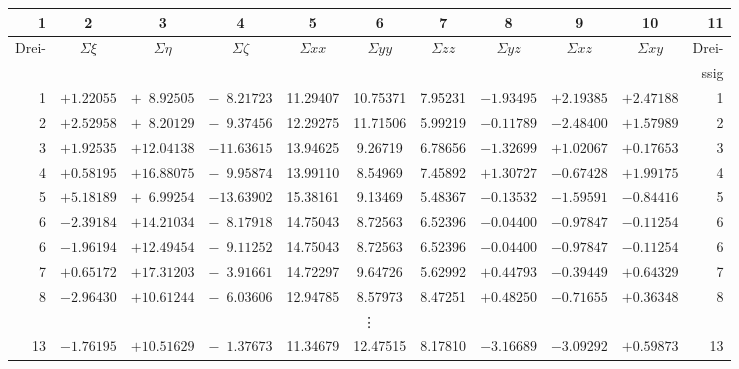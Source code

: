 \documentclass[12pt,a4paper]{article}
\theoremstyle{plain}
\theoremstyle{definition}
\theoremstyle{remark}
\begin{document}
\begin{footnotesize}
\begin{center}
\begin{tabular}{|r|c|c|c||c|c|c|c|c|c||r|}
\hline
1 & 2 & 3 & 4 & 5 & 6 & 7 & 8 & 9 & 10 & 11 \\
\hline
Drei- & $\Sigma\xi$ & $\Sigma\eta$ & $\Sigma\zeta$ &
$\Sigma xx$ & $\Sigma yy$ & $\Sigma zz$ & $\Sigma yz$ & $\Sigma xz$ & $\Sigma xy$ & Drei- \\
& & & & & & & & & & ssig \\
\hline
 1 & $+1.22055$ & $+\phantom{0}8.92505$ & $-\phantom{0}8.21723$ & 11.29407 & 10.75371 & 7.95231 & $-1.93495$ & $+2.19385$ & $+2.47188$ & 1 \\
 2 & $+2.52958$ & $+\phantom{0}8.20129$ & $-\phantom{0}9.37456$ & 12.29275 & 11.71506 & 5.99219 & $-0.11789$ & $-2.48400$ & $+1.57989$ & 2 \\
 3 & $+1.92535$ & $+12.04138$ & $-11.63615$ & 13.94625 & \phantom{0}9.26719 & 6.78656 & $-1.32699$ & $+1.02067$ & $+0.17653$ & 3 \\
 4 & $+0.58195$ & $+16.88075$ & $-\phantom{0}9.95874$ & 13.99110 & \phantom{0}8.54969 & 7.45892 & $+1.30727$ & $-0.67428$ & $+1.99175$ & 4 \\
\hline
 5 & $+5.18189$ & $+\phantom{0}6.99254$ & $-13.63902$ & 15.38161 & \phantom{0}9.13469 & 5.48367 & $-0.13532$ & $-1.59591$ & $-0.84416$ & 5 \\
 6 & $-2.39184$ & $+14.21034$ & $-\phantom{0}8.17918$ & 14.75043 & \phantom{0}8.72563 & 6.52396 & $-0.04400$ & $-0.97847$ & $-0.11254$ & 6 \\
 6 & $-1.96194$ & $+12.49454$ & $-\phantom{0}9.11252$ & 14.75043 & \phantom{0}8.72563 & 6.52396 & $-0.04400$ & $-0.97847$ & $-0.11254$ & 6 \\
 7 & $+0.65172$ & $+17.31203$ & $-\phantom{0}3.91661$ & 14.72297 & \phantom{0}9.64726 & 5.62992 & $+0.44793$ & $-0.39449$ & $+0.64329$ & 7 \\
 8 & $-2.96430$ & $+10.61244$ & $-\phantom{0}6.03606$ & 12.94785 & \phantom{0}8.57973 & 8.47251 & $+0.48250$ & $-0.71655$ & $+0.36348$ & 8 \\
\hline
\multicolumn{11}{c}{\vdots} \\
\hline
13 & $-1.76195$ & $+10.51629$ & $-\phantom{0}1.37673$ & 11.34679 & 12.47515 & 8.17810 & $-3.16689$ & $-3.09292$ & $+0.59873$ & 13 \\
\hline
\end{tabular}
\end{center}
\end{footnotesize}
\end{document}
